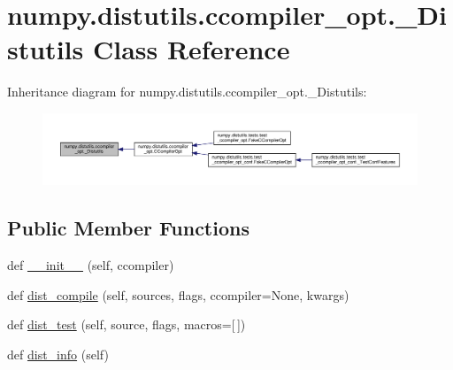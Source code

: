 \hypertarget{classnumpy_1_1distutils_1_1ccompiler__opt_1_1__Distutils}{}\section{numpy.\+distutils.\+ccompiler\+\_\+opt.\+\_\+\+Distutils Class Reference}
\label{classnumpy_1_1distutils_1_1ccompiler__opt_1_1__Distutils}


Inheritance diagram for numpy.\+distutils.\+ccompiler\+\_\+opt.\+\_\+\+Distutils\+:
\nopagebreak
\begin{figure}[H]
\begin{center}
\leavevmode
\includegraphics[width=350pt]{classnumpy_1_1distutils_1_1ccompiler__opt_1_1__Distutils__inherit__graph}
\end{center}
\end{figure}
\subsection*{Public Member Functions}
\begin{DoxyCompactItemize}
\item 
def \hyperlink{classnumpy_1_1distutils_1_1ccompiler__opt_1_1__Distutils_a442a62571b2a4907088bdb127195fccb}{\+\_\+\+\_\+init\+\_\+\+\_\+} (self, ccompiler)
\item 
def \hyperlink{classnumpy_1_1distutils_1_1ccompiler__opt_1_1__Distutils_a7d2d41a225bf692c181f54ce49f4b84d}{dist\+\_\+compile} (self, sources, flags, ccompiler=None, kwargs)
\item 
def \hyperlink{classnumpy_1_1distutils_1_1ccompiler__opt_1_1__Distutils_abf0bf519bc13e4cd34d9487f6b6b5b86}{dist\+\_\+test} (self, source, flags, macros=\mbox{[}$\,$\mbox{]})
\item 
def \hyperlink{classnumpy_1_1distutils_1_1ccompiler__opt_1_1__Distutils_ade87d7efe6ab782464011495602a8c48}{dist\+\_\+info} (self)
\end{DoxyCompactItemize}
